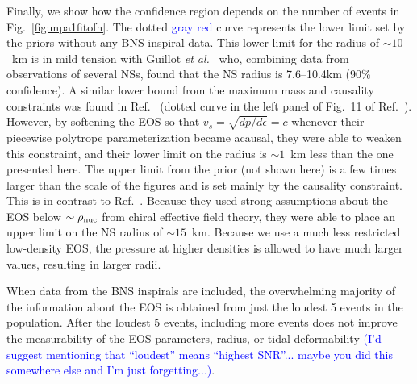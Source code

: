 \documentclass[twocolumn,prd,amssymb,aps,nofootinbib,showpacs,epsf]{revtex4}
\newcommand\les[2]{\textcolor{blue}{{#1}\sout{#2}}}
\begin{document}
Finally, we show how the confidence region depends on the number of events in Fig.~\ref{fig:mpa1fitofn}. The dotted \les{gray}{ red} curve represents the lower limit set by the priors without any BNS inspiral data. This lower limit for the radius of $\sim 10$~km is in mild tension with Guillot {\it et al.}~\cite{GuillotServillatWebb2013} who, combining data from observations of several NSs, found that the NS radius is 7.6--10.4km (90\% confidence). A similar lower bound from the maximum mass and causality constraints was found in Ref.~\cite{HebelerLattimerPethick2013} (dotted curve in the left panel of Fig.~11 of Ref.~\cite{HebelerLattimerPethick2013}). However, by softening the EOS so that $v_s = \sqrt{dp/d\epsilon} = c$ whenever their piecewise polytrope parameterization became acausal, they were able to weaken this constraint, and their lower limit on the radius is $\sim 1$~km less than the one presented here. The upper limit from the prior (not shown here) is a few times larger than the scale of the figures and is set mainly by the causality constraint. This is in contrast to Ref.~\cite{HebelerLattimerPethick2013}. Because they used strong assumptions about the EOS below $\sim \rho_{\rm nuc}$ from chiral effective field theory, they were able to place an upper limit on the NS radius of $\sim 15$~km. Because we use a much less restricted low-density EOS, the pressure at higher densities is allowed to have much larger values, resulting in larger radii.

When data from the BNS inspirals are included, the overwhelming majority of the information about the EOS is obtained from just the loudest 5 events in the population. After the loudest 5 events, including more events does not improve the measurability of the EOS parameters, radius, or tidal deformability \les{(I'd suggest mentioning that ``loudest'' means ``highest SNR''... maybe you did this somewhere else and I'm just forgetting...)}{}.
\end{document}
